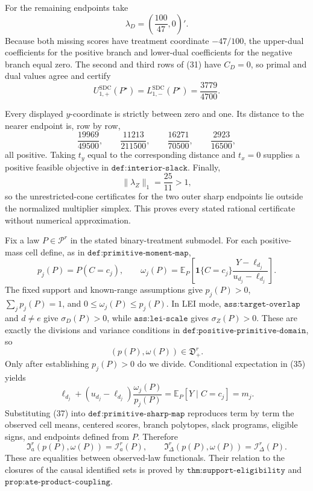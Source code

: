 For the remaining endpoints take
\[
 \lambda_D=\left(\frac{100}{47},0\right)'.
\]
Because both missing scores have treatment coordinate \(-47/100\), the upper-dual coefficients for the positive branch and lower-dual coefficients for the negative branch equal zero.  The second and third rows of (31) have \(C_D=0\), so primal and dual values agree and certify
\[
 U_{1,+}^{\mathrm{SDC}}(P^\star)
 =L_{1,-}^{\mathrm{SDC}}(P^\star)
 =\frac{3779}{4700}.                                                          \tag{33}
\]

Every displayed \(y\)-coordinate is strictly between zero and one.  Its distance to the nearer endpoint is, row by row,
\[
 \frac{19969}{49500},\qquad
 \frac{11213}{211500},\qquad
 \frac{16271}{70500},\qquad
 \frac{2923}{16500},                                                         \tag{34}
\]
all positive.  Taking \(t_y\) equal to the corresponding distance and \(t_x=0\) supplies a positive feasible objective in \(\texttt{def:interior-slack}\).  Finally,
\[
 \|\lambda_Z\|_1=\frac{25}{11}>1,
\]
so the unrestricted-cone certificates for the two outer sharp endpoints lie outside the normalized multiplier simplex.  This proves every stated rational certificate without numerical approximation.

Fix a law \(P\in\mathcal P^r\) in the stated binary-treatment submodel.  For each positive-mass cell define, as in \(\texttt{def:primitive-moment-map}\),
\[
 p_j(P)=P(C=c_j),\qquad
 \omega_j(P)=\mathbb E_P\!\left[
 \mathbf 1\{C=c_j\}\frac{Y-\ell_{d_j}}{u_{d_j}-\ell_{d_j}}
 \right].                                                                     \tag{35}
\]
The fixed support and known-range assumptions give \(p_j(P)>0\), \(\sum_jp_j(P)=1\), and \(0\le\omega_j(P)\le p_j(P)\).  In LEI mode, \(\texttt{ass:target-overlap}\) and \(d\ne e\) give \(\sigma_D(P)>0\), while \(\texttt{ass:lei-scale}\) gives \(\sigma_Z(P)>0\).  These are exactly the divisions and variance conditions in \(\texttt{def:positive-primitive-domain}\), so
\[
 (p(P),\omega(P))\in\mathfrak D_+^r.                                         \tag{36}
\]
Only after establishing \(p_j(P)>0\) do we divide.  Conditional expectation in (35) yields
\[
 \ell_{d_j}+(u_{d_j}-\ell_{d_j})\frac{\omega_j(P)}{p_j(P)}
 =\mathbb E_P[Y\mid C=c_j]=m_j.                                               \tag{37}
\]
Substituting (37) into \(\texttt{def:primitive-sharp-map}\) reproduces term by term the observed cell means, centered scores, branch polytopes, slack programs, eligible signs, and endpoints defined from \(P\).  Therefore
\[
 \mathfrak I_a^r(p(P),\omega(P))=\mathcal I_a^r(P),\qquad
 \mathfrak I_\Delta^r(p(P),\omega(P))=\mathcal I_\Delta^r(P).               \tag{38}
\]
These are equalities between observed-law functionals.  Their relation to the closures of the causal identified sets is proved by \(\texttt{thm:support-eligibility}\) and \(\texttt{prop:ate-product-coupling}\).

